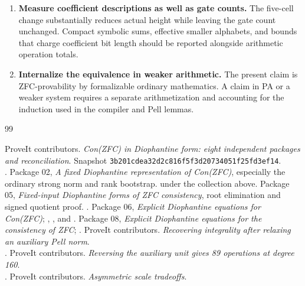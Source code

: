 \documentclass[11pt,a4paper]{article}
\theoremstyle{definition}\newtheorem{definition}[theorem]{Definition}
\theoremstyle{remark}\newtheorem{remark}[theorem]{Remark}
\newcommand{\pin}{\texttt{3b201cdea32d2c816f5f3d20734051f25fd3ef14}}
\begin{document}
\begin{enumerate}
degenerate branch explicitly.
\item \textbf{Measure coefficient descriptions as well as gate counts.}
The five-cell change substantially reduces actual height while leaving
the gate count unchanged. Compact symbolic sums, effective smaller
alphabets, and bounds that charge coefficient bit length should be
reported alongside arithmetic operation totals.
\item \textbf{Internalize the equivalence in weaker arithmetic.} The
present claim is ZFC-provability by formalizable ordinary mathematics.
A claim in PA or a weaker system requires a separate arithmetization
and accounting for the induction used in the compiler and Pell lemmas.
\end{enumerate}

\begin{thebibliography}{99}\footnotesize\raggedright
\setlength{\itemsep}{1pt}\setlength{\parskip}{0pt}
 ProveIt contributors.
\emph{Con(ZFC) in Diophantine form: eight independent packages and
reconciliation}. Snapshot \pin.\\
.
 Package 02, \emph{A fixed Diophantine representation
of Con(ZFC)}, especially the ordinary strong norm and rank bootstrap.
 under the collection above.
 Package 05, \emph{Fixed-input Diophantine forms of ZFC
consistency}, root elimination and signed quotient proof.
.
 Package 06, \emph{Explicit Diophantine equations for
Con(ZFC)}; ,
, and
.
 Package 08, \emph{Explicit Diophantine equations for
the consistency of ZFC};
.
 ProveIt contributors. \emph{Recovering integrality after
relaxing an auxiliary Pell norm}.\\
.
 ProveIt contributors. \emph{Reversing the auxiliary
unit gives 89 operations at degree 160}.\\
.
 ProveIt contributors. \emph{Asymmetric scale tradeoffs}.\\

\end{thebibliography}
\end{document}
